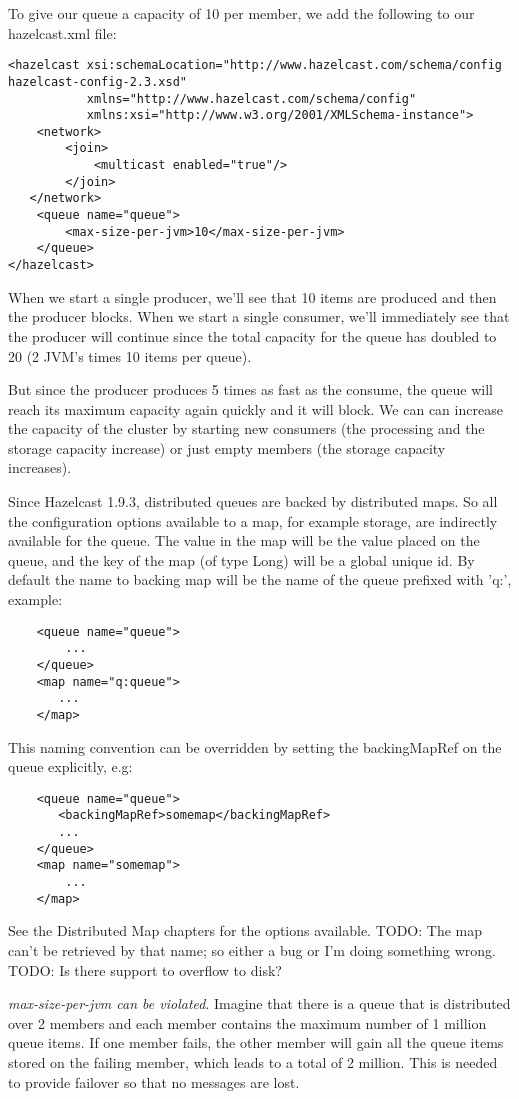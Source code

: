 To give our queue a capacity of 10 per member, we add the following to our hazelcast.xml file:
\begin{lstlisting}
<hazelcast xsi:schemaLocation="http://www.hazelcast.com/schema/config hazelcast-config-2.3.xsd"
           xmlns="http://www.hazelcast.com/schema/config"
           xmlns:xsi="http://www.w3.org/2001/XMLSchema-instance">
    <network>
        <join>
            <multicast enabled="true"/>
        </join>
   </network>
    <queue name="queue">
        <max-size-per-jvm>10</max-size-per-jvm>
    </queue>
</hazelcast>
\end{lstlisting}
When we start a single producer, we'll see that 10 items are produced and then the producer blocks. When we start a single consumer, we'll immediately see that the producer will continue since the total capacity for the queue has doubled to 20 (2 JVM's times 10 items per queue). 

But since the producer produces 5 times as fast as the consume, the queue will reach its maximum capacity again quickly and it will block. We can can increase the capacity of the cluster by starting new consumers (the processing and the storage capacity increase) or just empty members (the storage capacity increases).

Since Hazelcast 1.9.3, distributed queues are backed by distributed maps. So all the configuration options available to a map, for example storage, are indirectly available for the queue. The value in the map will be the value placed on the queue, and the key of the map (of type Long) will be a global unique id. By default the name to backing map will be the name of the queue prefixed with 'q:', example:
\begin{lstlisting}
    <queue name="queue">
        ...
    </queue>
    <map name="q:queue">
       ...
    </map>
\end{lstlisting}

This naming convention can be overridden by setting the backingMapRef on the queue explicitly, e.g:
\begin{lstlisting}
    <queue name="queue">
       <backingMapRef>somemap</backingMapRef>
       ... 
    </queue>
    <map name="somemap">
        ...
    </map>
\end{lstlisting}
See the Distributed Map chapters for the options available.
TODO: The map can't be retrieved by that name; so either a bug or I'm doing something wrong.
TODO: Is there support to overflow to disk?

\emph{max-size-per-jvm can be violated}. Imagine that there is a queue that is distributed over 2 members and each member contains the maximum number of 1 million queue items. If one member fails, the other member will gain all the queue items stored on the failing member, which leads to a total of 2 million. This is needed to provide failover so that no messages are lost. 

